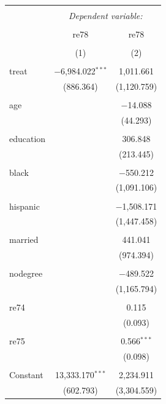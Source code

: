 \documentclass[nojss]{jss}
\begin{document}
\begin{table}[!htbp] \centering 
  \caption{} 
  \label{} 
\begin{tabular}{@{\extracolsep{5pt}}lcc} 
\\[-1.8ex]\hline 
\hline \\[-1.8ex] 
 & \multicolumn{2}{c}{\textit{Dependent variable:}} \\ 
\cline{2-3} 
\\[-1.8ex] & re78 & re78 \\ 
\\[-1.8ex] & (1) & (2)\\ 
\hline \\[-1.8ex] 
 treat & $-$6,984.022$^{***}$ & 1,011.661 \\ 
  & (886.364) & (1,120.759) \\ 
  & & \\ 
 age &  & $-$14.088 \\ 
  &  & (44.293) \\ 
  & & \\ 
 education &  & 306.848 \\ 
  &  & (213.445) \\ 
  & & \\ 
 black &  & $-$550.212 \\ 
  &  & (1,091.106) \\ 
  & & \\ 
 hispanic &  & $-$1,508.171 \\ 
  &  & (1,447.458) \\ 
  & & \\ 
 married &  & 441.041 \\ 
  &  & (974.394) \\ 
  & & \\ 
 nodegree &  & $-$489.522 \\ 
  &  & (1,165.794) \\ 
  & & \\ 
 re74 &  & 0.115 \\ 
  &  & (0.093) \\ 
  & & \\ 
 re75 &  & 0.566$^{***}$ \\ 
  &  & (0.098) \\ 
  & & \\ 
 Constant & 13,333.170$^{***}$ & 2,234.911 \\ 
  & (602.793) & (3,304.559) \\ 

\end{tabular}
\end{table}
\end{document}
